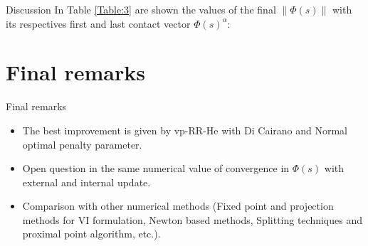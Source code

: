 \documentclass[8pt,red]{beamer}
\theoremstyle{plain}
\theoremstyle{definition}
\theoremstyle{remark}
\begin{document}
\begin{frame}{Discussion}
In Table \ref{Table:3} are shown the values of the final $\| \Phi(s) \|$ with its respectives first and last contact vector $\Phi(s)^{\alpha}$:
\begin{table}[h!]
\caption{Comparison of s-update}
\label{Table:3}
\end{table}

\end{frame}

\section{Final remarks}
\begin{frame}{Final remarks}
\begin{itemize}
\item The best improvement is given by vp-RR-He with Di Cairano and Normal optimal penalty parameter.
\item Open question in the same numerical value of convergence in  $\Phi(s)$ with external and internal update.
\item Comparison with other numerical methods (Fixed point and projection methods for VI formulation, Newton based methods, Splitting techniques and proximal point algorithm, etc.).
\end{itemize}
\end{frame}
\end{document}
